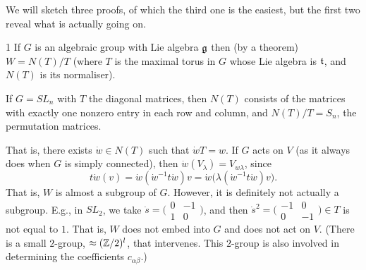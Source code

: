 We will sketch three proofs, of which the third one is the easiest, but the
first two reveal what is actually going on.

\begin{sketch}{1}
If $G$ is an algebraic group with Lie algebra $\mathfrak{g}$ then (by a theorem)
$W = N(T)/T$ (where $T$ is the maximal torus in $G$ whose Lie algebra is
$\mathfrak{t}$, and $N(T)$ is its normaliser).

\begin{example}
If $G = SL_n$ with $T$ the diagonal matrices, then $N(T)$ consists of the
matrices with exactly one nonzero entry in each row and column, and
$N(T)/T = S_n$, the permutation matrices.
\end{example}

That is, there exists $\dot w \in N(T)$ such that $\dot wT = w$. If $G$ acts on
$V$ (as it always does when $G$ is simply connected), then
$\dot w(V_\lambda) = V_{w\lambda}$, since
\[
  t\dot w(v) = \dot w(\dot w^{-1}t\dot w)v = \dot w\bigl(\lambda(\dot w^{-1}t\dot w)v\bigr).
\]
That is, $W$ is almost a subgroup of $G$. However, it is definitely not
actually a subgroup. E.g., in $SL_2$, we take
$\dot s = \bigl(\begin{smallmatrix} 0 & -1 \\ 1 & 0 \end{smallmatrix}\bigr)$,
and then
$\dot s^2 = \bigl(\begin{smallmatrix} -1 & 0 \\ 0 & -1 \end{smallmatrix}\bigr) \in T$
is not equal to $1$. That is, $W$ does not embed into $G$ and does not act on
$V$. (There is a small $2$-group, $\approx (\mathbb{Z}/2)^l$, that intervenes. This
$2$-group is also involved in determining the coefficients $c_{\alpha\beta}$.)
\end{sketch}

